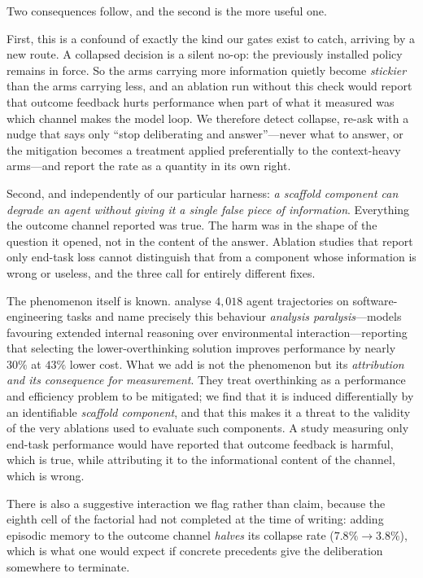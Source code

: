 \documentclass[11pt]{article}
\begin{document}
Two consequences follow, and the second is the more useful one.

First, this is a confound of exactly the kind our gates exist to catch, arriving by a new route. A
collapsed decision is a silent no-op: the previously installed policy remains in force. So the arms
carrying more information quietly become \emph{stickier} than the arms carrying less, and an ablation
run without this check would report that outcome feedback hurts performance when part of what it
measured was which channel makes the model loop. We therefore detect collapse, re-ask with a nudge
that says only ``stop deliberating and answer''---never what to answer, or the mitigation becomes a
treatment applied preferentially to the context-heavy arms---and report the rate as a quantity in its
own right.

Second, and independently of our particular harness: \emph{a scaffold component can degrade an agent
without giving it a single false piece of information}. Everything the outcome channel reported was
true. The harm was in the shape of the question it opened, not in the content of the answer. Ablation
studies that report only end-task loss cannot distinguish that from a component whose information is
wrong or useless, and the three call for entirely different fixes.

The phenomenon itself is known. \citet{cuadron2025overthinking} analyse $4{,}018$ agent trajectories
on software-engineering tasks and name precisely this behaviour \emph{analysis paralysis}---models
favouring extended internal reasoning over environmental interaction---reporting that selecting the
lower-overthinking solution improves performance by nearly $30\%$ at $43\%$ lower cost. What we add
is not the phenomenon but its \emph{attribution and its consequence for measurement}. They treat
overthinking as a performance and efficiency problem to be mitigated; we find that it is induced
differentially by an identifiable \emph{scaffold component}, and that this makes it a threat to the
validity of the very ablations used to evaluate such components. A study measuring only end-task
performance would have reported that outcome feedback is harmful, which is true, while attributing it
to the informational content of the channel, which is wrong.

There is also a suggestive interaction we flag rather than claim, because the eighth cell of the
factorial had not completed at the time of writing: adding episodic memory to the outcome channel
\emph{halves} its collapse rate ($7.8\% \to 3.8\%$), which is what one would expect if concrete
precedents give the deliberation somewhere to terminate.
\end{document}
